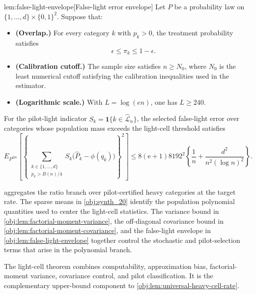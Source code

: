 \begin{lemmav}{lem:false-light-envelope}[False-light error envelope]
Let \(P\) be a probability law on \(\{1,\ldots,d\}\times\{0,1\}^2\). Suppose that:
\begin{itemize}
\item \textbf{(Overlap.)} For every category \(k\) with \(p_k>0\), the treatment probability satisfies
\[
\epsilon \le \pi_k \le 1-\epsilon .
\]
\item \textbf{(Calibration cutoff.)} The sample size satisfies \(n\ge N_0\), where \(N_0\) is the least numerical cutoff satisfying the calibration inequalities used in the estimator.
\item \textbf{(Logarithmic scale.)} With \(L=\log(en)\), one has \(L\ge 240\).
\end{itemize}
For the pilot-light indicator \(S_k=\mathbf 1\{k\in\widehat{\mathcal L}_n\}\), the selected false-light error over categories whose population mass exceeds the light-cell threshold satisfies
\[
E_{P^{\otimes n}}\left[
\left\{
\sum_{\substack{k\in\{1,\ldots,d\}\\ p_k>B(n)/4}}
S_k\bigl(\widehat P_k-\phi(q_k)\bigr)
\right\}^2
\right]
\le
8(\mathrm e+1)8192^2
\left\{
\frac1n+\frac{d^2}{n^2(\log n)^2}
\right\}.
\]
\end{lemmav}

 aggregates the ratio branch over pilot-certified heavy categories at the target rate. The sparse means in \cref{obj:synth_20} identify the population polynomial quantities used to center the light-cell statistics. The variance bound in \cref{obj:lem:factorial-moment-variance}, the off-diagonal covariance bound in \cref{obj:lem:factorial-moment-covariance}, and the false-light envelope in \cref{obj:lem:false-light-envelope} together control the stochastic and pilot-selection terms that arise in the polynomial branch.

The light-cell theorem combines computability, approximation bias, factorial-moment variance, covariance control, and pilot classification. It is the complementary upper-bound component to \cref{obj:lem:universal-heavy-cell-rate}.

